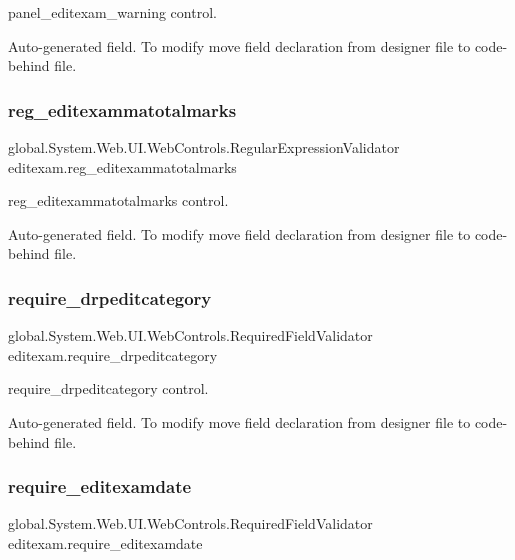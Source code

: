 panel\+\_\+editexam\+\_\+warning control. 

Auto-\/generated field. To modify move field declaration from designer file to code-\/behind file. \mbox{\label{classeditexam_a7333ccbc95934394aa1c7e31f06aad0d}} 
\subsubsection{\texorpdfstring{reg\_editexammatotalmarks}{reg\_editexammatotalmarks}}
{\footnotesize\ttfamily global.\+System.\+Web.\+U\+I.\+Web\+Controls.\+Regular\+Expression\+Validator editexam.\+reg\+\_\+editexammatotalmarks\hspace{0.3cm}{\ttfamily [protected]}}



reg\+\_\+editexammatotalmarks control. 

Auto-\/generated field. To modify move field declaration from designer file to code-\/behind file. \mbox{\label{classeditexam_a25c626f2837416e3ac17dda595f67192}} 
\subsubsection{\texorpdfstring{require\_drpeditcategory}{require\_drpeditcategory}}
{\footnotesize\ttfamily global.\+System.\+Web.\+U\+I.\+Web\+Controls.\+Required\+Field\+Validator editexam.\+require\+\_\+drpeditcategory\hspace{0.3cm}{\ttfamily [protected]}}



require\+\_\+drpeditcategory control. 

Auto-\/generated field. To modify move field declaration from designer file to code-\/behind file. \mbox{\label{classeditexam_a3255939b3509facda88675d9fd46c1a6}} 
\subsubsection{\texorpdfstring{require\_editexamdate}{require\_editexamdate}}
{\footnotesize\ttfamily global.\+System.\+Web.\+U\+I.\+Web\+Controls.\+Required\+Field\+Validator editexam.\+require\+\_\+editexamdate\hspace{0.3cm}{\ttfamily [protected]}}



